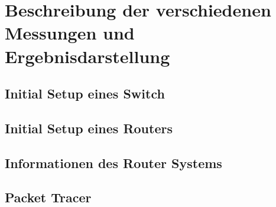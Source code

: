 \chapter{Beschreibung der verschiedenen Messungen und Ergebnisdarstellung}

\section{Initial Setup eines Switch}

\section{Initial Setup eines Routers}

\section{Informationen des Router Systems}

\section{Packet Tracer}